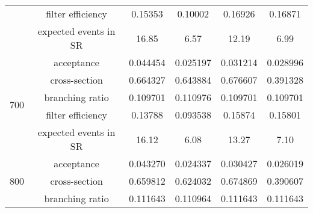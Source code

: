 \begin{table}[p]
{{\begin{tabular}{cccccc}
                                         & filter efficiency     & 0.15353                                    & 0.10002                                        & 0.16926                                    & 0.16871\\
                                         & expected events in SR & 16.85                                      & 6.57                                           & 12.19                                      & 6.99\\
                \hline
                \multirow{5}{*}{700}     & acceptance            & 0.044454                                   & 0.025197                                       & 0.031214                                   & 0.028996\\
                                         & cross-section         & 0.664327                                   & 0.643884                                       & 0.676607                                   & 0.391328\\
                                         & branching ratio       & 0.109701                                   & 0.110976                                       & 0.109701                                   & 0.109701\\
                                         & filter efficiency     & 0.13788                                    & 0.093538                                       & 0.15874                                    & 0.15801\\
                                         & expected events in SR & 16.12                                      & 6.08                                           & 13.27                                      & 7.10\\
                \hline
                \multirow{5}{*}{800}     & acceptance            & 0.043270                                   & 0.024337                                       & 0.030427                                   & 0.026019\\
                                         & cross-section         & 0.659812                                   & 0.624032                                       & 0.674869                                   & 0.390607\\
                                         & branching ratio       & 0.111643                                   & 0.110964                                       & 0.111643                                   & 0.111643\\

\end{tabular}}}
\end{table}
